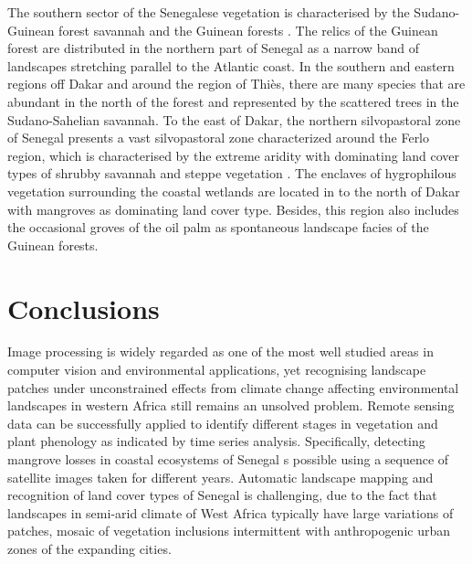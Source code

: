\documentclass[land,article,submit,pdftex,moreauthors]{Definitions/mdpi}
\begin{document}
The southern sector of the Senegalese vegetation is characterised by the Sudano-Guinean forest savannah and the Guinean forests \cite{Robequain}. The relics of the Guinean forest are distributed in the northern part of Senegal as a narrow band of landscapes stretching parallel to the Atlantic coast. In the southern and eastern regions off Dakar and around the region of Thiès, there are many species that are abundant in the north of the forest and represented by the scattered trees in the Sudano-Sahelian savannah. To the east of Dakar, the northern silvopastoral zone of Senegal presents a vast silvopastoral zone characterized around the Ferlo region, which is characterised by the extreme aridity with dominating land cover types of shrubby savannah and steppe vegetation \cite{land10070755}. The enclaves of hygrophilous vegetation surrounding the coastal wetlands are located in to the north of Dakar with mangroves as dominating land cover type. Besides, this region also includes the occasional groves of the oil palm as spontaneous landscape facies of the Guinean forests.

\section{Conclusions}

Image processing is widely regarded as one of the most well studied areas in computer vision and environmental applications, yet recognising landscape patches under unconstrained effects from climate change affecting environmental landscapes in western Africa still remains an unsolved problem. Remote sensing data can be successfully applied to identify different stages in vegetation and plant phenology as indicated by time series analysis. Specifically, detecting mangrove losses in coastal ecosystems of Senegal s possible using a sequence of satellite images taken for different years. Automatic landscape mapping and recognition of land cover types of Senegal is challenging, due to the fact that landscapes in semi-arid climate of West Africa typically have large variations of patches, mosaic of vegetation inclusions intermittent with anthropogenic urban zones of the expanding cities.
\end{document}
